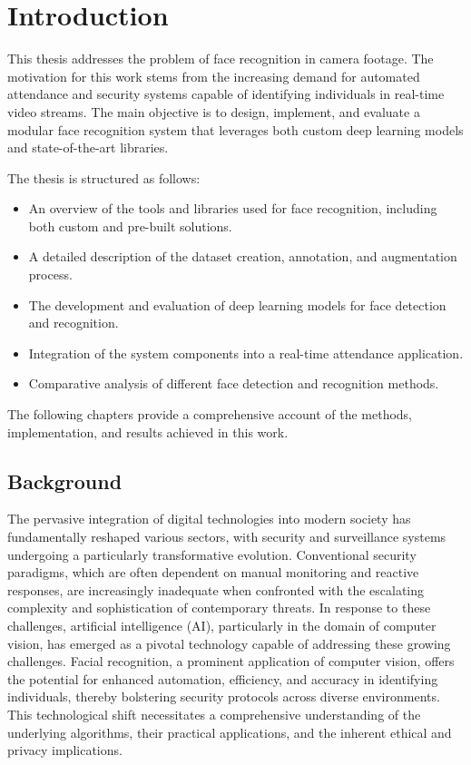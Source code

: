 \setcounter{page}{1}
\setcounter{equation}{0}
\setcounter{figure}{0}
\setcounter{table}{0}

\section*{Introduction}
This thesis addresses the problem of face recognition in camera footage. The motivation for this work stems from the increasing demand for automated attendance and security systems capable of identifying individuals in real-time video streams. The main objective is to design, implement, and evaluate a modular face recognition system that leverages both custom deep learning models and state-of-the-art libraries.

The thesis is structured as follows:
\begin{itemize}
    \item An overview of the tools and libraries used for face recognition, including both custom and pre-built solutions.
    \item A detailed description of the dataset creation, annotation, and augmentation process.
    \item The development and evaluation of deep learning models for face detection and recognition.
    \item Integration of the system components into a real-time attendance application.
    \item Comparative analysis of different face detection and recognition methods.
\end{itemize}

The following chapters provide a comprehensive account of the methods, implementation, and results achieved in this work.

\subsection*{Background}
The pervasive integration of digital technologies into modern society has fundamentally reshaped various sectors, with security and surveillance systems undergoing a particularly transformative evolution. Conventional security paradigms, which are often dependent on manual monitoring and reactive responses, are increasingly inadequate when confronted with the escalating complexity and sophistication of contemporary threats. In response to these challenges, artificial intelligence (AI), particularly in the domain of computer vision, has emerged as a pivotal technology capable of addressing these growing challenges. Facial recognition, a prominent application of computer vision, offers the potential for enhanced automation, efficiency, and accuracy in identifying individuals, thereby bolstering security protocols across diverse environments. This technological shift necessitates a comprehensive understanding of the underlying algorithms, their practical applications, and the inherent ethical and privacy implications.

